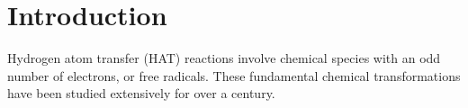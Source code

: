 
\chapter{Introduction}

Hydrogen atom transfer (HAT) reactions involve chemical species with an odd
number of electrons, or free radicals. These fundamental chemical
transformations have been studied extensively for over a
century.\cite{Kochi1973,Parsons2000}  
